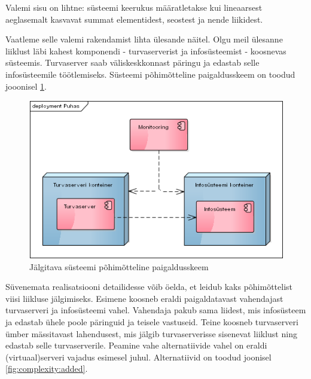 \documentclass{article}
\begin{document}
Valemi sisu on lihtne: süsteemi keerukus määratletakse kui lineaarsest aeglasemalt kasvavat summat elementidest, seostest ja nende liikidest. 

Vaatleme selle valemi rakendamist lihta ülesande näitel. Olgu meil ülesanne liiklust läbi kahest komponendi - turvaserverist ja infosüsteemist - koosnevas süsteemis. Turvaserver saab väliskeskkonnast päringu ja edastab selle infosüsteemile töötlemiseks. Süsteemi põhimõtteline paigaldusskeem on toodud jooonisel \ref{fig:complexity:pure}.

\begin{figure}[htp]
	\begin{center}
		\includegraphics[width=.7\textwidth]{puhas.png}
		\caption{Jälgitava süsteemi põhimõtteline paigaldusskeem}
		\label{fig:complexity:pure}
	\end{center}
\end{figure}

Süvenemata realisatsiooni detailidesse võib öelda, et leidub kaks põhimõttelist viisi liikluse jälgimiseks. Esimene koosneb eraldi paigaldatavast vahendajast turvaserveri ja infosüsteemi vahel. Vahendaja pakub sama liidest, mis infosüsteem ja edastab ühele poole päringuid ja teisele vastuseid. Teine koosneb turvaserveri ümber mässitavast lahendusest, mis jälgib turvaserverisse sisenevat liiklust ning edastab selle turvaserverile. Peamine vahe alternatiivide vahel on eraldi (virtuaal)serveri vajadus esimesel juhul. Alternatiivid on toodud joonisel \ref{fig:complexity:added}.
\end{document}
